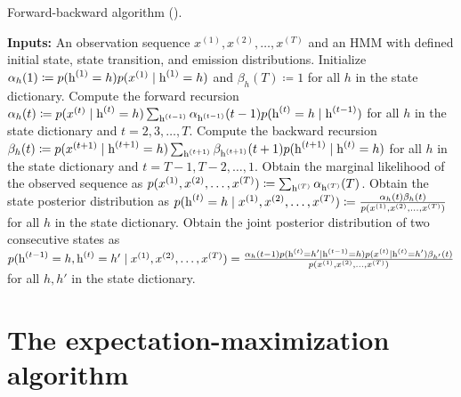 \begin{algorithm}
    \caption{Forward-backward algorithm (\citet{Rabiner1986}).}
    \label{alg:forward_backward}
    \begin{algorithmic}[1]
        \State \textbf{Inputs:} An observation sequence $x^{(1)}, x^{(2)}, \dots, x^{(T)}$ and an HMM with defined initial state, state transition, and emission distributions.
        \vspace{0.3cm}
        \State Initialize $\alpha_h(1) \coloneqq p({\textnormal{h}}^{(1)}=h)p(x^{(1)} \mid {\textnormal{h}}^{(1)}=h)$ and $\beta_h(T) \coloneqq 1$ for all $h$ in the state dictionary.
        \vspace{0.3cm}
        \State Compute the forward recursion $\alpha_h(t) \coloneqq p(x^{(t)} \mid {\textnormal{h}}^{(t)}=h) \sum_{{\textnormal{h}}^{(t-1)}} \alpha_{{\textnormal{h}}^{(t-1)}}(t-1) p({\textnormal{h}}^{(t)}=h \mid {\textnormal{h}}^{(t-1)})$ for all $h$ in the state dictionary and $t=2, 3, \dots, T$.
        \vspace{0.3cm}
        \State Compute the backward recursion $\beta_h(t) \coloneqq p(x^{(t+1)} \mid {\textnormal{h}}^{(t+1)}=h) \sum_{{\textnormal{h}}^{(t+1)}} \beta_{{\textnormal{h}}^{(t+1)}}(t+1) p({\textnormal{h}}^{(t+1)} \mid {\textnormal{h}}^{(t)}=h) $ for all $h$ in the state dictionary and $t=T-1, T-2, \dots, 1$.
        \vspace{0.3cm}
        \State Obtain the marginal likelihood of the observed sequence as $p(x^{(1)}, x^{(2)}, \dots, x^{(T)}) \coloneqq \sum_{{\textnormal{h}}^{(T)}} \alpha_{{\textnormal{h}}^{(T)}}(T)$.
        \vspace{0.3cm}
        \State Obtain the state posterior distribution as $p({\textnormal{h}}^{(t)}=h \mid x^{(1)}, x^{(2)}, \dots, x^{(T)}) \coloneqq \frac{\alpha_h(t)\beta_h(t)}{p(x^{(1)}, x^{(2)}, \dots, x^{(T)})}$ for all $h$ in the state dictionary.
        \vspace{0.3cm}
        \State Obtain the joint posterior distribution of two consecutive states as $p({\textnormal{h}}^{(t-1)}=h, {\textnormal{h}}^{(t)}=h' \mid x^{(1)}, x^{(2)}, \dots, x^{(T)}) = \frac{\alpha_h(t-1)p({\textnormal{h}}^{(t)}=h' \mid {\textnormal{h}}^{(t-1)}=h) p(x^{(t)} \mid {\textnormal{h}}^{(t)}=h')\beta_{h'}(t)}{p(x^{(1)}, x^{(2)}, \dots, x^{(T)})}$ for all $h,h'$ in the state dictionary.
    \end{algorithmic}
\end{algorithm}

\section{The expectation-maximization algorithm}
\label{sec:expectation_maximization}

